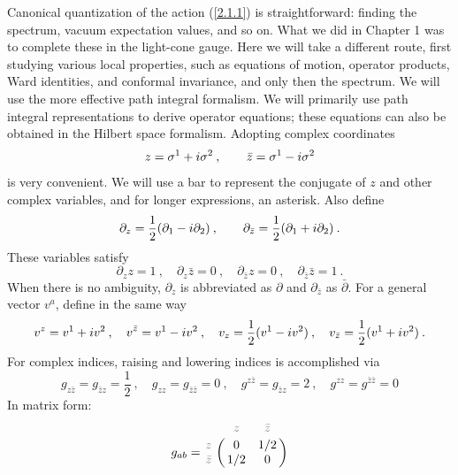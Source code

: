Canonical quantization of the action (\ref{2.1.1}) is straightforward: finding the spectrum, vacuum expectation values, and so on. What we did in Chapter 1 was to complete these in the light-cone gauge.    
Here we will take a different route, first studying various local properties, such as equations of motion, operator products, Ward identities, and conformal invariance, and only then the spectrum.    
We will use the more effective path integral formalism. We will primarily use path integral representations to derive operator equations; these equations can also be obtained in the Hilbert space formalism.    
Adopting complex coordinates    
\begin{equation}
	z=\sigma^{1}+ i \sigma^{2} \:, \qquad \bar{z}=\sigma^{1}- i \sigma^{2} \label{2.1.2}
\end{equation}
is very convenient. We will use a bar to represent the conjugate of $z$ and other complex variables, and for longer expressions, an asterisk. Also define    
\begin{equation}
	\partial_{z}=\frac{1}{2}(\partial_{1}- i \partial_{2}) \:, \qquad \partial_{\bar{z}}=\frac{1}{2}(\partial_{1}+ i \partial_{2}) \:.
	\label{2.1.3}
\end{equation}
These variables satisfy    
\begin{equation}
	\partial_{z} z=1 \:, \quad \partial_{z} \bar{z}=0 \:, \quad \partial_{\bar{z}} z=0 \:, \quad \partial_{\bar{z}} \bar{z}=1
	\:. \label{2.1.4}
\end{equation}
When there is no ambiguity, $\partial_{z}$ is abbreviated as $\partial$ and $\partial_{\bar{z}}$ as $\bar{\partial}$.    
For a general vector $v^{a}$, define in the same way    
\begin{equation}
	v^{z}=v^{1}+ i v^{2} \:, \quad v^{\bar{z}}=v^{1}- i v^{2} \:, \quad v_{z}=\frac{1}{2}(v^{1}-i v^{2}) \:, \quad v_{\bar{z}}=\frac{1}{2}(v^{1}+ i v^{2}) \:.
	\label{2.1.5}
\end{equation}
For complex indices, raising and lowering indices is accomplished via    
\begin{equation}
	g_{z \bar{z}}=g_{\bar{z} z}=\frac{1}{2} \:, \quad g_{z z}=g_{\bar{z} \bar{z}}=0 \:, \quad g^{z \bar{z}}=g_{\bar{z} z}=2 \:, \quad g^{z z}=g^{\bar{z} \bar{z}}=0
\end{equation}
In matrix form:
\begin{equation}\label{matrix-metric}
	g_{ab} = 
	\bordermatrix{
		& \textcolor{gray}{z} & \textcolor{gray}{\bar{z}} \cr
		\textcolor{gray}{z} & 0 & 1/2 \cr
		\textcolor{gray}{\bar{z}} & 1/2 & 0 \cr
	}
\end{equation}
